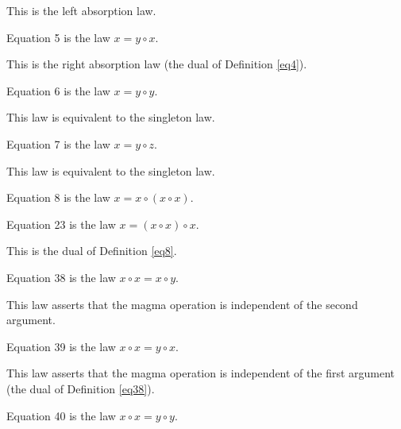 This is the left absorption law.

\begin{definition}[Equation 5]\label{eq5}\leanok{}  Equation 5 is the law $x=y \circ x$.
\end{definition}

This is the right absorption law (the dual of Definition \ref{eq4}).

\begin{definition}[Equation 6]\label{eq6}\leanok{}  Equation 6 is the law $x=y \circ y$.
\end{definition}

This law is equivalent to the singleton law.

\begin{definition}[Equation 7]\label{eq7}\leanok{}  Equation 7 is the law $x=y \circ z$.
\end{definition}

This law is equivalent to the singleton law.

\begin{definition}[Equation 8]\label{eq8}\leanok{}  Equation 8 is the law $x=x \circ (x \circ x)$.
\end{definition}

\begin{definition}[Equation 23]\label{eq23}\leanok{}  Equation 23 is the law $x= (x \circ x) \circ x$.
\end{definition}

This is the dual of Definition \ref{eq8}.

\begin{definition}[Equation 38]\label{eq38}\leanok{}  Equation 38 is the law $x \circ x = x \circ y$.
\end{definition}

This law asserts that the magma operation is independent of the second argument.

\begin{definition}[Equation 39]\label{eq39}\leanok{}  Equation 39 is the law $x \circ x = y \circ x$.
\end{definition}

This law asserts that the magma operation is independent of the first argument (the dual of Definition \ref{eq38}).

\begin{definition}[Equation 40]\label{eq40}\leanok{}  Equation 40 is the law $x \circ x = y \circ y$.
\end{definition}

